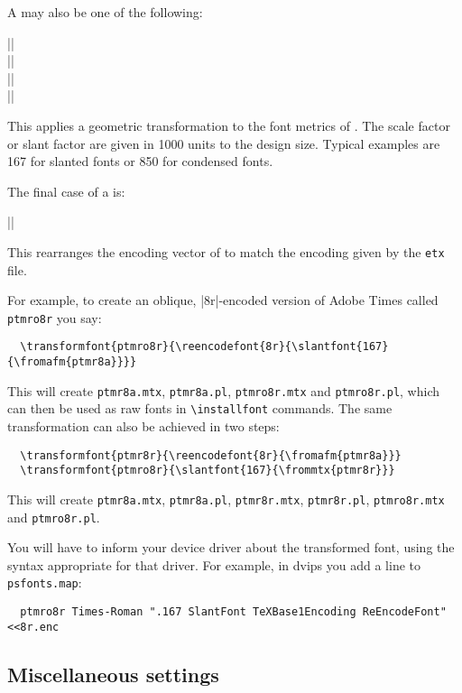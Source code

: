 \documentclass[a4paper]{ltxguide}
\newcommand*{\setfilename}[1]{\texttt{#1}}
\newcommand*{\setpackagename}[1]{\textsf{#1}}
\newcommand{\dvips}   {\setpackagename{dvips}\xspace}
\newcommand{\etx}{\setfilename{etx}\xspace}
\begin{document}
A  may also be one of the following:
\begin{decl}
  |\scalefont|\\
  |\xscalefont|\\
  |\yscalefont|\\
  |\slantfont|
\end{decl}
This applies a geometric transformation to the font metrics of
.  The scale factor or slant factor are given in
1000 units to the design size.  Typical examples are 167 for slanted
fonts or 850 for condensed fonts.

The final case of a  is:
\begin{decl}
  |\reencodefont|
\end{decl}
This rearranges the encoding vector of  to match 
the encoding given by the \etx file.


For example, to create an oblique, |8r|-encoded version of Adobe Times
called \texttt{ptmro8r} you say:
\begin{verbatim}
  \transformfont{ptmro8r}{\reencodefont{8r}{\slantfont{167}{\fromafm{ptmr8a}}}}
\end{verbatim}
This will create \texttt{ptmr8a.mtx}, \texttt{ptmr8a.pl},
\texttt{ptmro8r.mtx} and \texttt{ptmro8r.pl}, which can then be used
as raw fonts in \verb|\installfont| commands.  The same transformation
can also be achieved in two steps:
\begin{verbatim}
  \transformfont{ptmr8r}{\reencodefont{8r}{\fromafm{ptmr8a}}}
  \transformfont{ptmro8r}{\slantfont{167}{\frommtx{ptmr8r}}}
\end{verbatim}
This will create \texttt{ptmr8a.mtx}, \texttt{ptmr8a.pl},
\texttt{ptmr8r.mtx}, \texttt{ptmr8r.pl}, \texttt{ptmro8r.mtx} and
\texttt{ptmro8r.pl}.

You will have to inform your device driver about the transformed font,
using the syntax appropriate for that driver.  For example, in \dvips
you add a line to \texttt{psfonts.map}:
\begin{verbatim}
  ptmro8r Times-Roman ".167 SlantFont TeXBase1Encoding ReEncodeFont" <<8r.enc
\end{verbatim}


\subsection{Miscellaneous settings}
\end{document}
